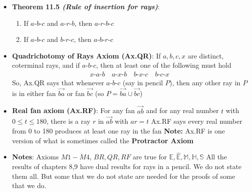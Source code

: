 \documentclass{report}
\begin{document}
\begin{itemize}
\begin{itemize}
                \item \textbf{Theorem 11.5 \textit{(Rule of insertion for rays)}}:
                    \begin{enumerate}[label=(\alph*)]
                        \item If $ a\text{-}b\text{-}c$ and $ a\text{-}r\text{-}b$, then $ a\text{-}r\text{-}b\text{-}c $
                        \item If $ a\text{-}b\text{-}c $ and $ b\text{-}r\text{-}c $, then $ a\text{-}b\text{-}r\text{-}c $
                    \end{enumerate}
                \item \textbf{Quadrichotomy of Rays Axiom (Ax.QR)}: If $a,b,c,x$ are distinct, coterminal rays, and if $ a\text{-}b\text{-}c$, then at least one of the following must hold
                    \begin{align*}
                        x\text{-}a\text{-}b \quad a\text{-}x\text{-}b \quad b\text{-}x\text{-}c \quad b\text{-}c\text{-}x
                    \end{align*}
                    \bigbreak \noindent 
                    So, Ax.QR says that whenever $ a\text{-}b\text{-}c$ (say in pencil $P$), then any other ray in $P$ is in either fan $\overrightarrow{ba}$ or fan $\overrightarrow{bc} $ (so $P = \overrightarrow{ba} \cup \overrightarrow{bc} $)
                \item \textbf{Real fan axiom (Ax.RF)}: For any fan $\overrightarrow{ab} $ and for any real number $t$ with $ 0 \leq t \leq 180$, there is a ray $r$ in $\overrightarrow{ab} $ with $ar = t $
                    \bigbreak \noindent 
                    Ax.RF says every real number from 0 to 180 produces at least one ray in the fan
                    \bigbreak \noindent 
                    \textbf{Note:} Ax.RF is one version of what is sometimes called the \textbf{Protractor Axiom}
                \item \textbf{Notes}: Axioms $M1-M4$, $BR,QR,RF$ are true for $\mathbb{E}, \hat{\mathbb{E}}, \mathbb{M}, \mathbb{H}, \mathbb{S}$
                    \bigbreak \noindent 
                    All the results of chapters 8,9 have dual results for rays in a pencil. We do not state them all. But some that we do not state are needed for the proofs of some that we do.
            \end{itemize}

    \end{itemize}
\end{document}
